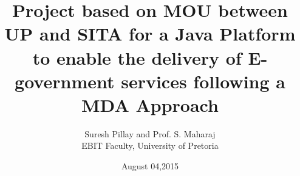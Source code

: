 \title{Project based on MOU between UP and SITA for a Java Platform to enable the delivery of E-government services following a MDA Approach}
\date{August 04,2015}
\author{Suresh Pillay and Prof. S. Maharaj\\ EBIT Faculty, University of Pretoria}

\makeatletter         
\def\@maketitle{
\raggedright
\texttt{[image: images/up-logo.png]}\\[8ex]
\raggedleft
\texttt{[image: images/be-up.png]}\\[8ex]
\begin{center}
{\Huge \bfseries \sffamily \@title }\\[4ex] 
{\Large  \@author}\\[4ex] 
\@date\\[8ex]
\texttt{[image: images/sita-logo.jpg]}
\end{center}}
\makeatother





